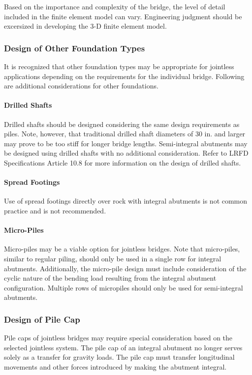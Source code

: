 Based on the importance and complexity of the bridge, the level of detail included in the finite element model can
vary. Engineering judgment should be excersized in developing the 3-D finite element model.

\subsubsection{Design of Other Foundation Types}
It is recognized that other foundation types may be appropriate for jointless applications depending on the
requirements for the individual bridge. Following are additional considerations for other foundations.
\paragraph{Drilled Shafts}
Drilled shafts should be designed considering the same design requirements as piles. Note, however, that
traditional drilled shaft diameters of 30 in. and larger may prove to be too stiff for longer bridge lengths. Semi-integral
abutments may be designed using drilled shafts with no additional consideration. Refer to LRFD Specifications
Article 10.8 for more information on the design of drilled shafts.

\paragraph{Spread Footings}
Use of spread footings directly over rock with integral abutments is not common practice and is not
recommended.

\paragraph{Micro-Piles}
Micro-piles may be a viable option for jointless bridges. Note that micro-piles, similar to regular piling, should
only be used in a single row for integral abutments. Additionally, the micro-pile design must include consideration of
the cyclic nature of the bending load resulting from the integral abutment configuration. Multiple rows of micropiles
should only be used for semi-integral abutments.

\subsubsection{Design of Pile Cap}
Pile caps of jointless bridges may require special consideration based on the selected jointless system. The pile
cap of an integral abutment no longer serves solely as a transfer for gravity loads. The pile cap must transfer
longitudinal movements and other forces introduced by making the abutment integral.


